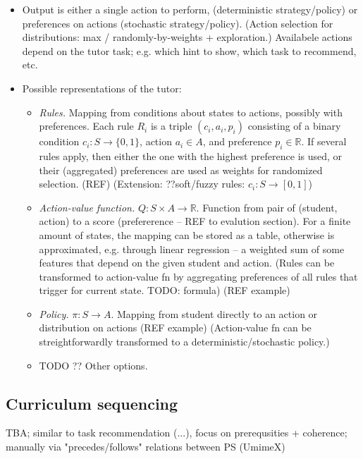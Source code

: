 \begin{itemize}
\item Output is either a single action to perform,
  (deterministic strategy/policy)
  or preferences on actions (stochastic strategy/policy).
  (Action selection for distributions: max / randomly-by-weights +
  exploration.)
  Availabele actions depend on the tutor task;
  e.g. which hint to show, which task to recommend, etc.
\item Possible representations of the tutor:
\begin{itemize}
\item \emph{Rules.}
  Mapping from conditions about states to actions, possibly with preferences.
  Each rule $R_i$ is a triple $(c_i, a_i, p_i)$
  consisting of a binary condition $c_i: S \rightarrow \{0, 1\}$,
  action $a_i \in A$, and preference $p_i \in \mathbb{R}$.
  If several rules apply, then either the one with the highest preference is used,
  or their (aggregated) preferences are used as weights for randomized selection.
  (REF)
  (Extension: ??soft/fuzzy rules: $c_i: S\rightarrow [0, 1]$)
\item \emph{Action-value function.}  %
  $Q: S \times A \rightarrow \mathbb{R}$.
  Function from pair of (student, action) to a score
  (prefererence -- REF to evalution section).
  For a finite amount of states, the mapping can be stored as a table,
  otherwise is approximated, e.g. through linear regression -- a weighted sum
  of some features that depend on the given student and action.
  (Rules can be transformed to action-value fn by aggregating preferences of
  all rules that trigger for current state. TODO: formula)
  (REF example)
\item \emph{Policy.}  %
  $\pi: S \rightarrow A$.
  Mapping from student directly to an action or distribution on actions
  (REF example)
  (Action-value fn can be streightforwardly transformed to a
  deterministic/stochastic policy.)
\item TODO ?? Other options.
\end{itemize}
\end{itemize}


\subsection{Curriculum sequencing}

TBA; similar to task recommendation (...), focus on prerequsities + coherence;
manually via "precedes/follows" relations between PS (UmimeX)


